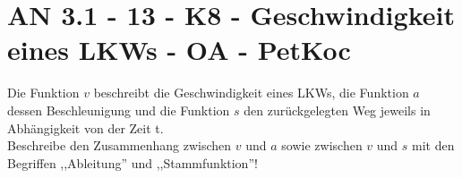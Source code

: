 \section{AN 3.1 - 13 - K8 - Geschwindigkeit eines LKWs - OA - PetKoc}

\begin{beispiel}[AN 3.1]{1}
Die Funktion $v$ beschreibt die Geschwindigkeit eines LKWs, die Funktion $a$ dessen Beschleunigung und die Funktion $s$ den zurückgelegten Weg jeweils in Abhängigkeit von der Zeit t. \\Beschreibe den Zusammenhang zwischen $v$ und $a$ sowie zwischen $v$ und $s$ mit den Begriffen ,,Ableitung'' und ,,Stammfunktion''!

\end{beispiel}